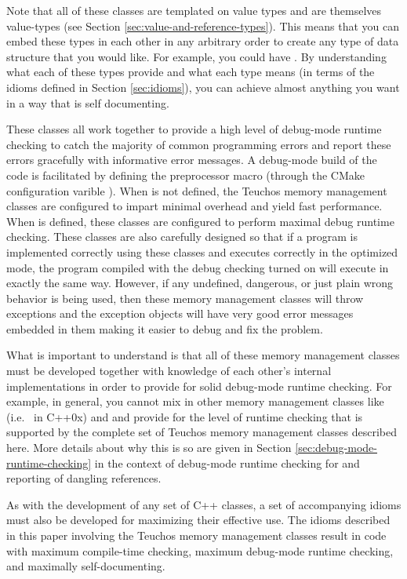 \documentclass[pdf,ps2pdf,11pt]{SANDreport}
\begin{document}
Note that all of these classes are templated on value types and are
themselves value-types (see Section
{}\ref{sec:value-and-reference-types}).  This means that you can embed
these types in each other in any arbitrary order to create any type of
data structure that you would like.  For example, you could have
{}.  By
understanding what each of these types provide and what each type
means (in terms of the idioms defined in Section {}\ref{sec:idioms}),
you can achieve almost anything you want in a way that is self
documenting.

These classes all work together to provide a high level of debug-mode
runtime checking to catch the majority of common programming errors
and report these errors gracefully with informative error messages.  A
debug-mode build of the code is facilitated by defining the
preprocessor macro {} (through the CMake
configuration varible {}).  When
{} is not defined, the Teuchos memory management
classes are configured to impart minimal overhead and yield fast
performance.  When {} is defined, these classes
are configured to perform maximal debug runtime checking.  These
classes are also carefully designed so that if a program is
implemented correctly using these classes and executes correctly in
the optimized mode, the program compiled with the debug checking
turned on will execute in exactly the same way.  However, if any
undefined, dangerous, or just plain wrong behavior is being used, then
these memory management classes will throw exceptions and the
exception objects will have very good error messages embedded in them
making it easier to debug and fix the problem.

What is important to understand is that all of these memory management
classes must be developed together with knowledge of each other's
internal implementations in order to provide for solid debug-mode
runtime checking.  For example, in general, you cannot mix in other
memory management classes like {} (i.e.\
{} in C++0x) and {} and provide
for the level of runtime checking that is supported by the complete
set of Teuchos memory management classes described here.  More details
about why this is so are given in Section
{}\ref{sec:debug-mode-runtime-checking} in the context of debug-mode
runtime checking for and reporting of dangling references.

As with the development of any set of C++ classes, a set of
accompanying idioms must also be developed for maximizing their
effective use.  The idioms described in this paper involving the
Teuchos memory management classes result in code with maximum
compile-time checking, maximum debug-mode runtime checking, and
maximally self-documenting.
\end{document}
